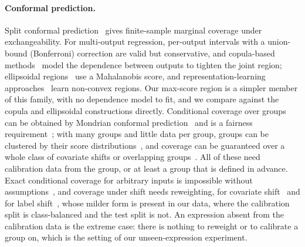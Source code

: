 \paragraph{Conformal prediction.} Split conformal
prediction~\cite{vovk2005algorithmic,lei2018distribution,angelopoulos2021gentle}
gives finite-sample marginal coverage under exchangeability. For multi-output
regression, per-output intervals with a union-bound (Bonferroni) correction are
valid but conservative, and copula-based methods~\cite{messoudi2021copula} model
the dependence between outputs to tighten the joint region; ellipsoidal
regions~\cite{messoudi2022ellipsoidal} use a Mahalanobis score, and
representation-learning approaches~\cite{feldman2023calibrated} learn
non-convex regions. Our max-score region is a simpler member of this family,
with no dependence model to fit, and we compare against the copula and
ellipsoidal constructions directly. Conditional
coverage over groups can be obtained by Mondrian conformal
prediction~\cite{vovk2012conditional} and is a fairness
requirement~\cite{romano2020malice}; with many groups and little data per
group, groups can be clustered by their score
distributions~\cite{ding2023class}, and coverage can be guaranteed over a
whole class of covariate shifts or overlapping
groups~\cite{gibbs2025conditional}. All of these need calibration data from
the group, or at least a group that is defined in advance. Exact conditional coverage for arbitrary
inputs is impossible without assumptions~\cite{barber2021limits}, and coverage
under shift needs reweighting, for covariate shift~\cite{tibshirani2019covariate}
and for label shift~\cite{podkopaev2021label}, whose milder form is present in
our data, where the calibration split is class-balanced and the test split is
not. An expression
absent from the calibration data is the extreme case: there is nothing to
reweight or to calibrate a group on, which is the setting of our unseen-expression
experiment.
